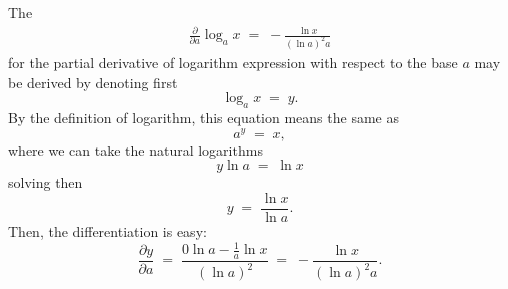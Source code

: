 \documentclass[12pt]{article}
\theoremstyle{definition}
\begin{document}
The 
\begin{align}
\frac{\partial}{\partial a}\log_ax \;=\; -\frac{\ln{x}}{(\ln{a})^2a}
\end{align}
for the partial derivative of logarithm expression with respect to the base $a$ may be derived by denoting first
$$\log_ax \;=\; y.$$
By the definition of logarithm, this equation means the same as
$$a^y \;=\; x,$$
where we can take the natural logarithms
$$y\ln{a} \;=\; \ln{x}$$
solving then
$$y \;=\; \frac{\ln{x}}{\ln{a}}.$$
Then, the differentiation is easy:
$$\frac{\partial y}{\partial a} \;=\; \frac{0\ln{a}-\frac{1}{a}\ln{x}}{(\ln{a})^2} \;=\; -\frac{\ln{x}}{(\ln{a})^2a}.$$
\end{document}
